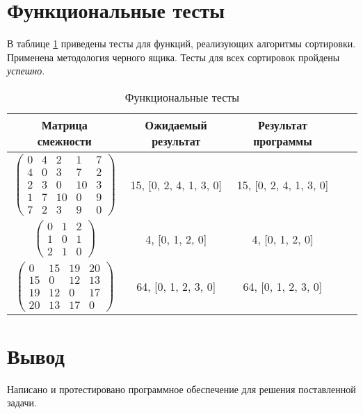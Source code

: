 \section{Функциональные тесты}

В таблице \ref{tbl:functional_test} приведены тесты для функций, реализующих алгоритмы сортировки. Применена методология черного ящика. Тесты для всех сортировок пройдены \textit{успешно}.

\begin{center}
	\captionsetup{justification=raggedright,singlelinecheck=off}
	\begin{longtable}[c]{|c|c|c|c|c|}
		\caption{Функциональные тесты\label{tbl:functional_test}} \\ \hline
		Матрица смежности & Ожидаемый результат & Результат программы \\
		\hline
		$ \begin{pmatrix}
			0 &  4 &  2 &  1 & 7 \\
			4 &  0 &  3 &  7 & 2 \\
			2 &  3 &  0 & 10 & 3 \\
			1 &  7 & 10 &  0 & 9 \\
			7 &  2 &  3 &  9 & 0
		\end{pmatrix}$ &
		15, [0, 2, 4, 1, 3, 0] &
		15, [0, 2, 4, 1, 3, 0] \\
		
		$ \begin{pmatrix}
			0 & 1 & 2 \\
			1 & 0 & 1 \\
			2 & 1 & 0	
		\end{pmatrix}$ &
		4, [0, 1, 2, 0] &
		4, [0, 1, 2, 0] \\
		
		$ \begin{pmatrix}
			0 & 15 & 19 & 20 \\
			15 &  0 & 12 & 13 \\
			19 & 12 &  0 & 17 \\
			20 & 13 & 17 &  0
		\end{pmatrix}$ &
		64, [0, 1, 2, 3, 0] &
		64, [0, 1, 2, 3, 0] \\
		\hline
	\end{longtable}
\end{center}

\section*{Вывод}
Написано и протестировано программное обеспечение для решения поставленной задачи.